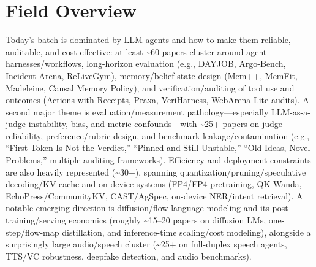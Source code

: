\documentclass[12pt,letterpaper]{article}
\begin{document}
\section*{Field Overview}
{\footnotesize Today's batch is dominated by LLM agents and how to make them reliable, auditable, and cost-effective: at least \textasciitilde{}60 papers cluster around agent harnesses/workflows, long-horizon evaluation (e.g., DAYJOB, Argo-Bench, Incident-Arena, ReLiveGym), memory/belief-state design (Mem++, MemFit, Madeleine, Causal Memory Policy), and verification/auditing of tool use and outcomes (Actions with Receipts, Praxa, VeriHarness, WebArena-Lite audits). A second major theme is evaluation/measurement pathology---especially LLM-as-a-judge instability, bias, and metric confounds---with \textasciitilde{}25+ papers on judge reliability, preference/rubric design, and benchmark leakage/contamination (e.g., ``First Token Is Not the Verdict,'' ``Pinned and Still Unstable,'' ``Old Ideas, Novel Problems,'' multiple auditing frameworks). Efficiency and deployment constraints are also heavily represented (\textasciitilde{}30+), spanning quantization/pruning/speculative decoding/KV-cache and on-device systems (FP4/FP4 pretraining, QK-Wanda, EchoPress/CommunityKV, CAST/AgSpec, on-device NER/intent retrieval). A notable emerging direction is diffusion/flow language modeling and its post-training/serving economics (roughly \textasciitilde{}15--20 papers on diffusion LMs, one-step/flow-map distillation, and inference-time scaling/cost modeling), alongside a surprisingly large audio/speech cluster (\textasciitilde{}25+ on full-duplex speech agents, TTS/VC robustness, deepfake detection, and audio benchmarks).}
\end{document}
